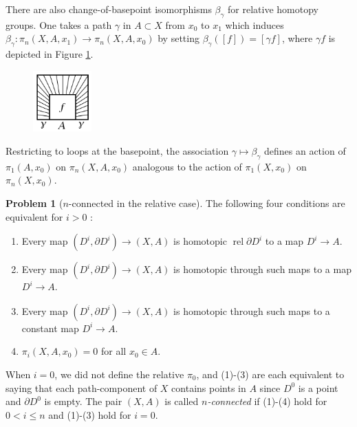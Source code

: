 \documentclass[reqno]{amsart}
\theoremstyle{definition}
\newtheorem{problem}[theorem]{Problem}
\theoremstyle{remark}
\DeclareMathOperator{\rel}{rel}
\begin{document}
There are also change-of-basepoint isomorphisms
$\beta_{\gamma}$ for relative homotopy groups.
One takes a path  $\gamma$ in $A \subset X$ from
$x_0$ to $x_1$ which induces
$\beta_{\gamma} \colon \pi_n (X,A,x_1) \to 
\pi_n (X,A,x_0)$ by setting
$\beta_{\gamma} \left( \left[ f \right]  \right) 
= \left[ \gamma f \right] $, where
$\gamma f$ is depicted in 
Figure \ref{fig:DIWIOA-png}.

\begin{figure}[htpb]
    \centering
    \includegraphics[width=0.2\textwidth]{DIWIOA.png}
    \caption{}
    \label{fig:DIWIOA-png}
\end{figure}

Restricting to loops at the
basepoint, the association $\gamma \mapsto 
\beta_{\gamma}$ defines an action
of $\pi_1 \left( A, x_0 \right) $ on
$\pi_n \left( X, A, x_0 \right) $ analogous to the
action of $\pi_1 \left( X, x_0 \right) $ on
$\pi_n (X,x_0)$.










\begin{problem}[$n$-connected in the relative case]\label{n-connected-relative}
    The following four conditions are equivalent for
    $i>0$ :
    \begin{enumerate}
        \item Every map
            $\left( D^{i} , \partial D^{i} \right) \to 
            \left( X,A \right) $ is homotopic
            $\rel \partial D^{i}$ to a map $D^{i} \to A$.
        \item Every map $\left( D^{i},\partial D^{i} \right) 
            \to (X,A)$ is homotopic through such maps
            to a map $D^{i} \to A$.
        \item Every map $\left( D^{i}, \partial D^{i} \right) 
            \to \left( X,A \right) $ is homotopic through such
            maps to a constant map $D^{i} \to A$.
        \item $\pi_i \left( X, A, x_0 \right) = 0$ for all
            $x_0 \in A$.
    \end{enumerate}
    When $i = 0$, we did not define the relative $\pi_0$,
    and (1)-(3) are each equivalent to saying that
    each path-component of $X$ contains points
    in $A$ since $D^{0}$ is a point and
    $\partial D^{0}$ is empty. The pair
    $\left( X, A \right) $ is called \textit{$n$-connected}
    if (1)-(4) hold for $0<i\le n$ and
    (1)-(3) hold for  $i=0$.
\end{problem}
\end{document}
